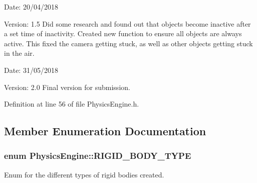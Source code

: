 \begin{Desc}
\item[Date:]20/04/2018 \end{Desc}
\begin{Desc}
\item[Version:]1.5 Did some research and found out that objects become inactive after a set time of inactivity. Created new function to ensure all objects are always active. This fixed the camera getting stuck, as well as other objects getting stuck in the air.\end{Desc}
\begin{Desc}
\item[Date:]31/05/2018 \end{Desc}
\begin{Desc}
\item[Version:]2.0 Final version for submission. \end{Desc}


Definition at line 56 of file PhysicsEngine.h.

\subsection{Member Enumeration Documentation}
\hypertarget{class_physics_engine_f9cf664e8df4f9a518448aa122957077}{
\subsubsection[RIGID\_\-BODY\_\-TYPE]{\setlength{\rightskip}{0pt plus 5cm}enum {\bf PhysicsEngine::RIGID\_\-BODY\_\-TYPE}}}
\label{class_physics_engine_f9cf664e8df4f9a518448aa122957077}


Enum for the different types of rigid bodies created. 

